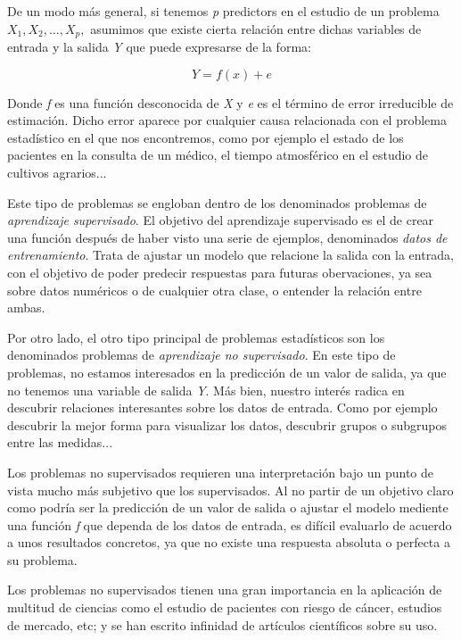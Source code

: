 \documentclass[12pt,a4paper,Spanish]{book}
\begin{document}
De un modo más general, si tenemos \textit{p} predictors en el estudio de un problema  
$X_1,X_2,...,X_p,$ asumimos que existe cierta relación entre dichas variables de entrada y la salida \textit{Y} que puede expresarse de la forma:

\begin{equation}
Y=f(x)+e
\end{equation}

Donde \textit{f} es una función desconocida de \textit{X} y \textit{e} es el término de error irreducible de estimación. Dicho error aparece por cualquier causa relacionada con el problema estadístico en el que nos encontremos, como por ejemplo el estado de los pacientes en la consulta de un médico, el tiempo atmosférico en el estudio de cultivos agrarios...

Este tipo de problemas se engloban dentro de los denominados problemas de \textit{aprendizaje supervisado}. El objetivo del aprendizaje supervisado es el de crear una función después de haber visto una serie de ejemplos, denominados \textit{datos de entrenamiento}. Trata de ajustar un modelo que relacione la salida con la entrada, con el objetivo de poder predecir respuestas para futuras obervaciones, ya sea sobre datos numéricos o de cualquier otra clase, o entender la relación entre ambas.

Por otro lado, el otro tipo principal de problemas estadísticos son los denominados problemas de \textit{aprendizaje no supervisado}. En este tipo de problemas, no estamos interesados en la predicción de un valor de salida, ya que no tenemos una variable de salida \textit{Y}. Más bien, nuestro interés radica en descubrir relaciones interesantes sobre los datos de entrada. Como por ejemplo descubrir la mejor forma para visualizar los datos, descubrir grupos o subgrupos entre las medidas...

Los problemas no supervisados requieren una interpretación bajo un punto de vista mucho más subjetivo que los supervisados. Al no partir de un objetivo claro como podría ser la predicción de un valor de salida o ajustar el modelo mediente una función \textit{f} que dependa de los datos de entrada, es difícil evaluarlo de acuerdo a unos resultados concretos, ya que no existe una respuesta absoluta o perfecta a su problema.

Los problemas no supervisados tienen una gran importancia en la aplicación de multitud de ciencias como el estudio de pacientes con riesgo de cáncer, estudios de mercado, etc; y se han escrito infinidad de artículos científicos sobre su uso.
\end{document}
